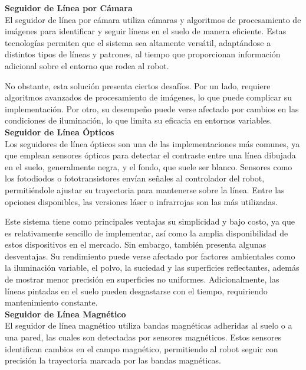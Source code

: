 \textbf{Seguidor de Línea por Cámara} \mbox{} \vspace{6pt} \\
El seguidor de línea por cámara utiliza cámaras y algoritmos de procesamiento de imágenes para identificar y seguir líneas en el suelo de manera eficiente. Estas tecnologías permiten que el sistema sea altamente versátil, adaptándose a distintos tipos de líneas y patrones, al tiempo que proporcionan información adicional sobre el entorno que rodea al robot.

No obstante, esta solución presenta ciertos desafíos. Por un lado, requiere algoritmos avanzados de procesamiento de imágenes, lo que puede complicar su implementación. Por otro, su desempeño puede verse afectado por cambios en las condiciones de iluminación, lo que limita su eficacia en entornos variables. \cite{inianlinefollowcamera} \\


\textbf{Seguidor de Línea Ópticos} \mbox{} \vspace{6pt} \\
Los seguidores de línea ópticos son una de las implementaciones más comunes, ya que emplean sensores ópticos para detectar el contraste entre una línea dibujada en el suelo, generalmente negra, y el fondo, que suele ser blanco. Sensores como los fotodiodos o fototransistores envían señales al controlador del robot, permitiéndole ajustar su trayectoria para mantenerse sobre la línea. Entre las opciones disponibles, las versiones láser o infrarrojas son las más utilizadas.

Este sistema tiene como principales ventajas su simplicidad y bajo costo, ya que es relativamente sencillo de implementar, así como la amplia disponibilidad de estos dispositivos en el mercado. Sin embargo, también presenta algunas desventajas. Su rendimiento puede verse afectado por factores ambientales como la iluminación variable, el polvo, la suciedad y las superficies reflectantes, además de mostrar menor precisión en superficies no uniformes. Adicionalmente, las líneas pintadas en el suelo pueden desgastarse con el tiempo, requiriendo mantenimiento constante. \\


\textbf{Seguidor de Línea Magnético} \mbox{} \vspace{6pt} \\
El seguidor de línea magnético utiliza bandas magnéticas adheridas al suelo o a una pared, las cuales son detectadas por sensores magnéticos. Estos sensores identifican cambios en el campo magnético, permitiendo al robot seguir con precisión la trayectoria marcada por las bandas magnéticas.


